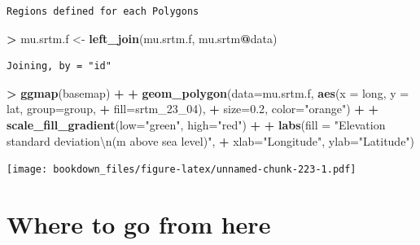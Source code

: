 \documentclass[]{krantz}
\makeatletter
\newenvironment{Shaded}{\begin{snugshade}}{\end{snugshade}}
\newcommand{\KeywordTok}[1]{\textcolor[rgb]{0.27,0.27,0.27}{\textbf{#1}}}
\newcommand{\DataTypeTok}[1]{\textcolor[rgb]{0.27,0.27,0.27}{#1}}
\newcommand{\DecValTok}[1]{\textcolor[rgb]{0.06,0.06,0.06}{#1}}
\newcommand{\FloatTok}[1]{\textcolor[rgb]{0.06,0.06,0.06}{#1}}
\newcommand{\CharTok}[1]{\textcolor[rgb]{0.5,0.5,0.5}{#1}}
\newcommand{\StringTok}[1]{\textcolor[rgb]{0.5,0.5,0.5}{#1}}
\newcommand{\OperatorTok}[1]{\textcolor[rgb]{0.43,0.43,0.43}{\textbf{#1}}}
\newcommand{\NormalTok}[1]{#1}
\newenvironment{kframe}{%
\medskip{}
\setlength{\fboxsep}{.8em}
 \def\at@end@of@kframe{}%
 \ifinner\ifhmode%
  \def\at@end@of@kframe{\end{minipage}}%
  \begin{minipage}{\columnwidth}%
 \fi\fi%
 \def\FrameCommand##1{\hskip\@totalleftmargin \hskip-\fboxsep
 \colorbox{shadecolor}{##1}\hskip-\fboxsep
     \hskip-\linewidth \hskip-\@totalleftmargin \hskip\columnwidth}%
 \MakeFramed {\advance\hsize-\width
   \@totalleftmargin\z@ \linewidth\hsize
   \@setminipage}}%
 {\par\unskip\endMakeFramed%
 \at@end@of@kframe}
\renewenvironment{Shaded}{\begin{kframe}}{\end{kframe}}
\makeatother
\begin{document}
\begin{verbatim}
Regions defined for each Polygons
\end{verbatim}

\begin{Shaded}
\begin{Highlighting}[]
\OperatorTok{>}\StringTok{ }\NormalTok{mu.srtm.f <-}\StringTok{ }\KeywordTok{left_join}\NormalTok{(mu.srtm.f, mu.srtm}\OperatorTok{@}\NormalTok{data)}
\end{Highlighting}
\end{Shaded}

\begin{verbatim}
Joining, by = "id"
\end{verbatim}

\begin{Shaded}
\begin{Highlighting}[]
\OperatorTok{>}\StringTok{ }\KeywordTok{ggmap}\NormalTok{(basemap) }\OperatorTok{+}
\OperatorTok{+}\StringTok{     }\KeywordTok{geom_polygon}\NormalTok{(}\DataTypeTok{data=}\NormalTok{mu.srtm.f, }\KeywordTok{aes}\NormalTok{(}\DataTypeTok{x =}\NormalTok{ long, }\DataTypeTok{y =}\NormalTok{ lat, }\DataTypeTok{group=}\NormalTok{group, }
\OperatorTok{+}\StringTok{                                      }\DataTypeTok{fill=}\NormalTok{srtm_23_}\DecValTok{04}\NormalTok{), }
\OperatorTok{+}\StringTok{                  }\DataTypeTok{size=}\FloatTok{0.2}\NormalTok{, }\DataTypeTok{color=}\StringTok{"orange"}\NormalTok{) }\OperatorTok{+}
\OperatorTok{+}\StringTok{     }\KeywordTok{scale_fill_gradient}\NormalTok{(}\DataTypeTok{low=}\StringTok{"green"}\NormalTok{, }\DataTypeTok{high=}\StringTok{"red"}\NormalTok{) }\OperatorTok{+}
\OperatorTok{+}\StringTok{         }\KeywordTok{labs}\NormalTok{(}\DataTypeTok{fill =} \StringTok{"Elevation standard deviation}\CharTok{\textbackslash{}n}\StringTok{(m above sea level)"}\NormalTok{, }
\OperatorTok{+}\StringTok{          }\DataTypeTok{xlab=}\StringTok{"Longitude"}\NormalTok{, }\DataTypeTok{ylab=}\StringTok{"Latitude"}\NormalTok{)}
\end{Highlighting}
\end{Shaded}

\texttt{[image: bookdown\_files/figure-latex/unnamed-chunk-223-1.pdf]}

\section{Where to go from here}\label{where-to-go-from-here}
\end{document}
